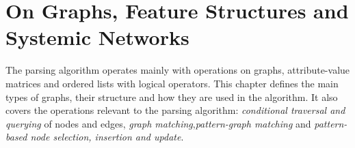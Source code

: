 \chapter{On Graphs, Feature Structures and Systemic Networks}
\label{ch:data-structures}

%

The parsing algorithm operates mainly with operations on graphs, attribute-value matrices and ordered lists with logical operators. This chapter defines the main types of graphs, their structure and how they are used in the algorithm. It also covers the operations relevant to the parsing algorithm: \textit{conditional traversal and querying} of nodes and edges, \textit{graph matching},\textit{pattern-graph matching} and \textit{pattern-based node selection, insertion and update}.

